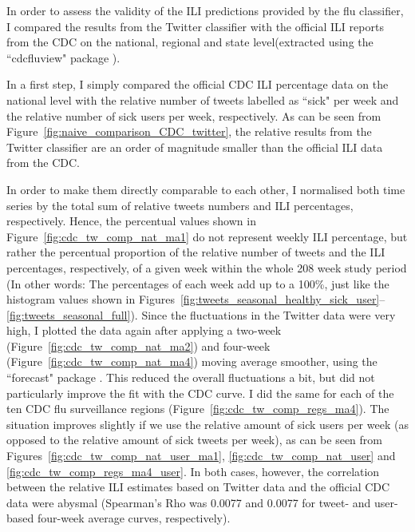 \documentclass[11pt, a4paper,twoside]{report}\usepackage[]{graphicx}\usepackage[]{color}
\begin{document}
In order to assess the validity of the ILI predictions provided by the flu classifier, I compared the results from the Twitter classifier with the official ILI reports from the CDC on the national, regional and state level(extracted using the ``cdcfluview" package \citep{cdcfluview}).

In a first step, I simply compared the official CDC ILI percentage data on the national level with the relative number of tweets labelled as ``sick" per week and the relative number of sick users per week, respectively. As can be seen from Figure~\ref{fig:naive_comparison_CDC_twitter}, the relative results from the Twitter classifier are an order of magnitude smaller than the official ILI data from the CDC.

In order to make them directly comparable to each other, I normalised both time series by the total sum of relative tweets numbers and ILI percentages, respectively. Hence, the percentual values shown in Figure~\ref{fig:cdc_tw_comp_nat_ma1} do not represent weekly ILI percentage, but rather the percentual proportion of the relative number of tweets and the ILI percentages, respectively, of a given week within the whole 208 week study period (In other words: The percentages of each week add up to a 100\%, just like the histogram values shown in Figures~\ref{fig:tweets_seasonal_healthy_sick_user}--\ref{fig:tweets_seasonal_full}). Since the fluctuations in the Twitter data were very high, I plotted the data again after applying a two-week (Figure~\ref{fig:cdc_tw_comp_nat_ma2}) and four-week (Figure~\ref{fig:cdc_tw_comp_nat_ma4}) moving average smoother, using the ``forecast" package \citep{forecast}. This reduced the overall fluctuations a bit, but did not particularly improve the fit with the CDC curve. I did the same for each of the ten CDC flu surveillance regions (Figure~\ref{fig:cdc_tw_comp_regs_ma4}). The situation improves slightly if we use the relative amount of sick users per week (as opposed to the relative amount of sick tweets per week), as can be seen  from Figures~\ref{fig:cdc_tw_comp_nat_user_ma1}, \ref{fig:cdc_tw_comp_nat_user} and \ref{fig:cdc_tw_comp_regs_ma4_user}. In both cases, however, the correlation between the relative ILI estimates based on Twitter data and the official CDC data were abysmal (Spearman's Rho was 0.0077 and 0.0077 for tweet- and user-based four-week average curves, respectively). 
\end{document}
